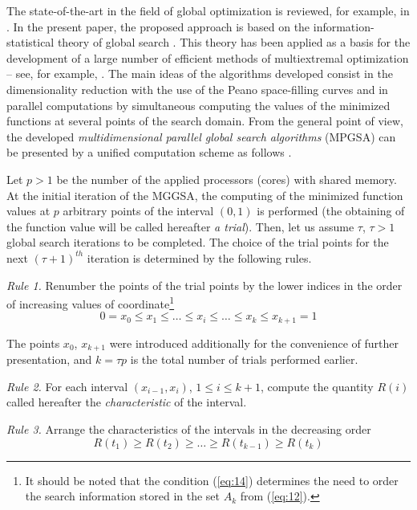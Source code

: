 \documentclass[runningheads]{llncs}
\begin{document}
The state-of-the-art in the field of global optimization is reviewed, for example, in \cite{c10,c12,c13}. In the present paper, the proposed approach is based on the information-statistical theory of global search \cite{c10}. This theory has been applied as a basis for the development of a large number of efficient methods of multiextremal optimization -- see, for example, \cite{c6,c7,c8,c9,c10,c11,c15,c16,c17,c18}. The main ideas of the algorithms developed consist in the dimensionality reduction with the use of the Peano space-filling curves and in parallel computations by simultaneous computing the values of the minimized functions at several points of the search domain. From the general point of view, the developed \textit{multidimensional parallel global search algorithms} (MPGSA) can be presented by a unified computation scheme as follows \cite{c6,c10,c15}.

Let $p>1$ be the number of the applied processors (cores) with shared memory. At the initial iteration of the MGGSA, the computing of the minimized function values at $p$ arbitrary points of the interval $(0,1)$ is performed (the obtaining of the function value will be called hereafter \textit{a trial}). Then, let us assume $\tau$, $\tau > 1$ global search iterations to be completed. The choice of the trial points for the next $(\tau+1)^{th}$ iteration is determined by the following rules.

\textit{Rule 1.} Renumber the points of the trial points by the lower indices in the order of increasing values of coordinate\footnote{It should be noted that the condition (\ref{eq:14}) determines the need to order the search information stored in the set $A_k$ from (\ref{eq:12}).}
\begin{equation}
0 = x_0 \leq x_1 \leq \dots \leq x_i \leq \dots \leq x_k \leq x_{k+1}=1
\label{eq:14}
\end{equation}

The points $x_0$, $x_{k+1}$ were introduced additionally for the convenience of further presentation, and $k=\tau p$ is the total number of trials performed earlier.

\textit{Rule 2.} For each interval $(x_{i-1} ,x_i)$, $1 \leq i \leq k+1$, compute the quantity $R(i)$ called hereafter the \textit{characteristic} of the interval.

\textit{Rule 3.} Arrange the characteristics of the intervals in the decreasing order 
\begin{equation}
 R(t_1 ) \geq R(t_2 )\geq \dots \geq R(t_{k-1} ) \geq R(t_k)
\label{eq:15}
\end{equation}
\end{document}
